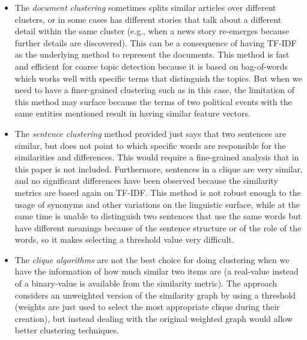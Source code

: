 \begin{itemize}
    \item The \emph{document clustering} sometimes splits similar articles over different clusters, or in some cases has different stories that talk about a different detail within the same cluster (e.g., when a news story re-emerges because further details are discovered).
    This can be a consequence of having TF-IDF as the underlying method to represent the documents.
    This method is fast and efficient for coarse topic detection because it is based on bag-of-words which works well with specific terms that distinguish the topics.
    But when we need to have a finer-grained clustering such as in this case, the limitation of this method may surface because the terms of two political events with the same entities mentioned result in having similar feature vectors.
    \item The \emph{sentence clustering} method provided just says that two sentences are similar, but does not point to which specific words are responsible for the similarities and differences. This would require a fine-grained analysis that in this paper is not included. Furthermore, sentences in a clique are very similar, and no significant differences have been observed because the similarity metrics are based again on TF-IDF. This method is not robust enough to the usage of synonyms and other variations on the linguistic surface, while at the same time is unable to distinguish two sentences that use the same words but have different meanings because of the sentence structure or of the role of the words, so it makes selecting a threshold value very difficult.
    \item The \emph{clique algorithms} are not the best choice for doing clustering when we have the information of how much similar two items are (a real-value instead of a binary-value is available from the similarity metric). The approach considers an unweighted version of the similarity graph by using a threshold (weights are just used to select the most appropriate clique during their creation), but instead dealing with the original weighted graph would allow better clustering techniques. %
\end{itemize}


